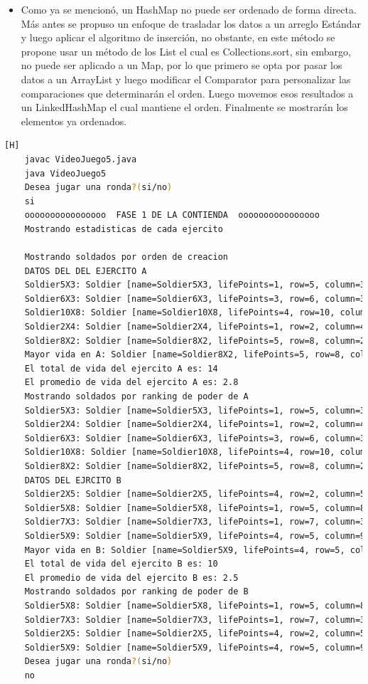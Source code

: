 \documentclass{article}
\begin{document}
	
	\begin{itemize}	
		\item Como ya se mencionó, un HashMap no puede ser ordenado de forma directa. Más antes se propuso un enfoque de trasladar los datos a un arreglo Estándar y luego aplicar el algoritmo de inserción, no obstante, en este método se propone usar un método de los List el cual es Collections.sort, sin embargo, no puede ser aplicado a un Map, por lo que primero se opta por pasar los datos a un ArrayList y luego modificar el Comparator para personalizar las comparaciones que determinarán el orden. Luego movemos esos resultados a un LinkedHashMap el cual mantiene el orden. Finalmente se mostrarán los elementos ya ordenados.
	\end{itemize}
	
	
	\begin{lstlisting}[language=bash,caption={Compilando y probando }][H]
	javac VideoJuego5.java
	java VideoJuego5
	Desea jugar una ronda?(si/no)
	si
	oooooooooooooooo  FASE 1 DE LA CONTIENDA  oooooooooooooooo
	Mostrando estadisticas de cada ejercito
	
	Mostrando soldados por orden de creacion
	DATOS DEL DEL EJERCITO A
	Soldier5X3: Soldier [name=Soldier5X3, lifePoints=1, row=5, column=3]
	Soldier6X3: Soldier [name=Soldier6X3, lifePoints=3, row=6, column=3]
	Soldier10X8: Soldier [name=Soldier10X8, lifePoints=4, row=10, column=8]
	Soldier2X4: Soldier [name=Soldier2X4, lifePoints=1, row=2, column=4]
	Soldier8X2: Soldier [name=Soldier8X2, lifePoints=5, row=8, column=2]
	Mayor vida en A: Soldier [name=Soldier8X2, lifePoints=5, row=8, column=2]
	El total de vida del ejercito A es: 14
	El promedio de vida del ejercito A es: 2.8
	Mostrando soldados por ranking de poder de A
	Soldier5X3: Soldier [name=Soldier5X3, lifePoints=1, row=5, column=3]
	Soldier2X4: Soldier [name=Soldier2X4, lifePoints=1, row=2, column=4]
	Soldier6X3: Soldier [name=Soldier6X3, lifePoints=3, row=6, column=3]
	Soldier10X8: Soldier [name=Soldier10X8, lifePoints=4, row=10, column=8]
	Soldier8X2: Soldier [name=Soldier8X2, lifePoints=5, row=8, column=2]
	DATOS DEL EJRCITO B
	Soldier2X5: Soldier [name=Soldier2X5, lifePoints=4, row=2, column=5]
	Soldier5X8: Soldier [name=Soldier5X8, lifePoints=1, row=5, column=8]
	Soldier7X3: Soldier [name=Soldier7X3, lifePoints=1, row=7, column=3]
	Soldier5X9: Soldier [name=Soldier5X9, lifePoints=4, row=5, column=9]
	Mayor vida en B: Soldier [name=Soldier5X9, lifePoints=4, row=5, column=9]
	El total de vida del ejercito B es: 10
	El promedio de vida del ejercito B es: 2.5
	Mostrando soldados por ranking de poder de B
	Soldier5X8: Soldier [name=Soldier5X8, lifePoints=1, row=5, column=8]
	Soldier7X3: Soldier [name=Soldier7X3, lifePoints=1, row=7, column=3]
	Soldier2X5: Soldier [name=Soldier2X5, lifePoints=4, row=2, column=5]
	Soldier5X9: Soldier [name=Soldier5X9, lifePoints=4, row=5, column=9]
	Desea jugar una ronda?(si/no)
	no
	\end{lstlisting}
	
\end{document}

